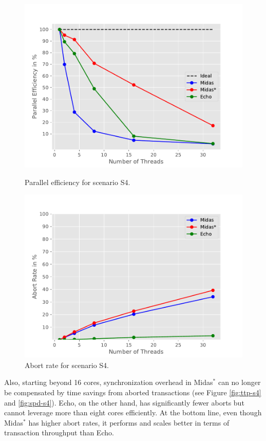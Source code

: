 \begin{figure}[h!]
\begin{minipage}[l]{0.50\textwidth}
    \includegraphics[width=\textwidth]{figures/bench/eff-ll}
    \caption{Parallel efficiency for scenario S4.}
    \label{fig:eff-s4}
\end{minipage}
\begin{minipage}[l]{0.50\textwidth}
    \includegraphics[width=\textwidth]{figures/bench/ar-ll}
    \caption{Abort rate for scenario S4.}
    \label{fig:ar-s4}
\end{minipage}
\end{figure}

\clearpage

Also, starting beyond 16 cores, synchronization overhead in Midas$^{*}$ can no
longer be compensated by time savings from aborted transactions (see Figure
\ref{fig:ttp-s4} and \ref{fig:spd-s4}). Echo, on the other hand, has
significantly fewer aborts but cannot leverage more than eight cores
efficiently. At the bottom line, even though Midas$^{*}$ has higher abort rates,
it performs and scales better in terms of transaction throughput than Echo.
